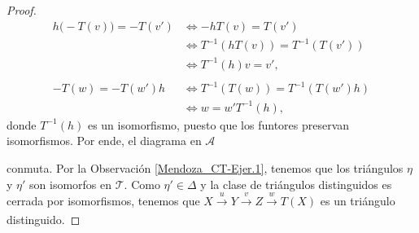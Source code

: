 \documentclass[tesis]{subfiles}
\begin{document}
\begin{proof}
    \begin{align*}
        h\big(-T(v)\big) = -T(v') &\iff -hT(v) = T(v') \\
                                  &\iff T^{-1}(hT(v)) = T^{-1}(T(v')) \tag{$T$ es automorfismo} \\ 
                                  &\iff T^{-1}(h)v = v', \\ \\
            -T(w) = -T(w')h &\iff T^{-1}(T(w)) = T^{-1}(T(w')h) \\
                            &\iff w = w'T^{-1}(h),
    \end{align*}
    donde $T^{-1}(h)$ es un isomorfismo, puesto que los funtores preservan isomorfismos. Por ende, el diagrama en $\mathscr{A}$
    \begin{center}
    \end{center}
    conmuta. Por la Observación \ref{Mendoza_CT-Ejer.1}, tenemos que los triángulos $\eta$ y $\eta'$ son isomorfos en $\mathscr{T}$. Como $\eta'\in\Delta$ y la clase de triángulos distinguidos es cerrada por isomorfismos, tenemos que $X\xrightarrow[]{u}Y\xrightarrow[]{v}Z\xrightarrow[]{w}T(X)$ es un triángulo distinguido.
\end{proof}
\end{document}
